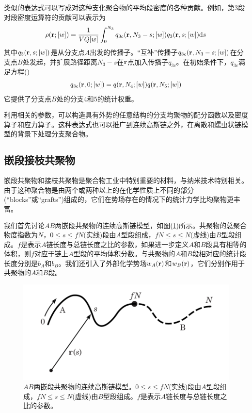 类似的表达式可以写成对这种支化聚合物的平均段密度的各种贡献。例如，第$3$段对段密度运算符的贡献可以表示为
\begin{equation}
\rho(\mathbf{r};[w])=\frac{1}{VQ[w]}\int _{0}^{N_3} q_{3c}(\mathbf{r},N_3-s;[w])q_3(\mathbf{r},s;[w]) \mathrm{d}s
\end{equation}
其中$q_3(\mathbf{r},s;[w])$是从分支点$A$出发的传播子。“互补”传播子$q_{3c}(\mathbf{r},N_3-s;[w])$在分支点$B$处发起，并扩展路径距离$N_3-s$在$\mathbf{r}$点加入传播子$q_{3c}$。在初始条件下，$q_{3c}$满足方程(\label{传播子求导})
\begin{equation}
q_{3c}(\mathbf{r},0;[w])=q(\mathbf{r},N_4;[w])q(\mathbf{r},N_5;[w])
\end{equation}
它提供了分支点$B$处的分支$4$和$5$的统计权重。

利用相关的参数，可以构造具有外势的任意结构的分支均聚物的配分函数以及密度算子和应力算子。这种表达式也可以推广到连续高斯链之外，在离散和蠕虫状链模型的背景下处理分支聚合物。

\subsection{嵌段接枝共聚物}
嵌段共聚物和接枝共聚物是聚合物工业中特别重要的材料，与纳米技术特别相关。由于这种聚合物是由两个或两种以上的在化学性质上不同的部分(“blocks”或“grafts”)组成的，它们在势场存在的情况下的统计力学比均聚物更丰富。

我们首先讨论$AB$两嵌段共聚物的连续高斯链模型，如图(\ref{图37})所示。共聚物的总聚合物度指数为$N$，$0\leq s \leq fN$(实线)段由$A$型段组成，$fN \leq s \leq N$(虚线)由$B$型段组成。$f$是表示$A$链长度与总链长度之比的参数，如果进一步定义$A$和$B$段具有相等的体积，则$f$对应于链上$A$型段的平均体积分数。与共聚物的$A$和$B$段相对应的统计段长度分别是$b_A$和$b_B$。我们还引入了外部化学势场$w_A(\mathbf{r})$和$w_B(\mathbf{r})$，它们分别作用于共聚物的$A$和$B$段。

\begin{figure}[H]
\centering
\includegraphics[scale=0.7]{Contents/chapter3/figures/37.png}
\caption{$AB$两嵌段共聚物的连续高斯链模型。$0\leq s \leq fN$(实线)段由$A$型段组成，$fN \leq s \leq N$(虚线)由$B$型段组成。$f$是表示$A$链长度与总链长度之比的参数。}
\label{图37}
\end{figure}

